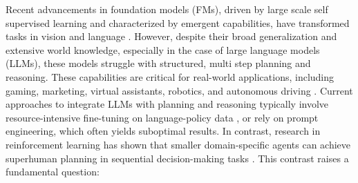 \documentclass{article}
\theoremstyle{plain}
\theoremstyle{definition}
\theoremstyle{remark}
\begin{document}

Recent advancements in foundation models (FMs), driven by large scale self supervised learning and characterized by emergent capabilities, have transformed tasks in vision and language \cite{bommasani2021opportunities}. However, despite their broad generalization and extensive world knowledge, especially in the case of large language models (LLMs), these models struggle with structured, multi step planning and reasoning. These capabilities are critical for real-world applications, including gaming, marketing, virtual assistants, robotics, and autonomous driving \cite{wei2022emergent,strohman2005indri,huang2022inner,brohan2022rt}. Current approaches to integrate LLMs with planning and reasoning typically involve resource-intensive fine-tuning on language-policy data \cite{feng2024chessgpt}, or rely on prompt engineering, which often yields suboptimal results. In contrast, research in reinforcement learning has shown that smaller domain-specific agents can achieve superhuman planning in sequential decision-making tasks \cite{campbell2002deep}. This contrast raises a fundamental question:
\vspace{-2mm}
\end{document}

